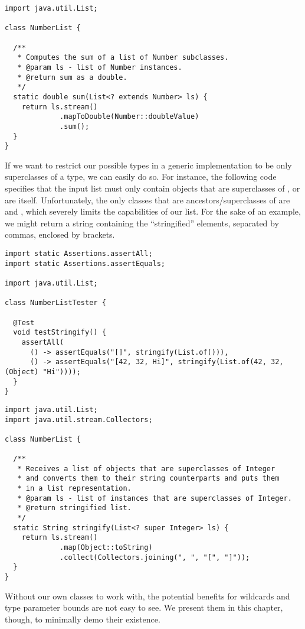 \begin{lstlisting}[language=MyJava]
import java.util.List;

class NumberList {

  /**
   * Computes the sum of a list of Number subclasses.
   * @param ls - list of Number instances.
   * @return sum as a double.
   */
  static double sum(List<? extends Number> ls) {
    return ls.stream()
             .mapToDouble(Number::doubleValue)
             .sum();
  }
}
\end{lstlisting}

If we want to restrict our possible types in a generic implementation to be only superclasses of a type, we can easily do so. 
For instance, the following code specifies that the input list must only contain objects that are superclasses of , or are  itself. 
Unfortunately, the only classes that are ancestors/superclasses of  are  and , which severely limits the capabilities of our list. 
For the sake of an example, we might return a string containing the ``stringified'' elements, separated by commas, enclosed by brackets.

\enlargethispage{-1\baselineskip}
\begin{lstlisting}[language=MyJava]
import static Assertions.assertAll;
import static Assertions.assertEquals;

import java.util.List;

class NumberListTester {

  @Test
  void testStringify() {
    assertAll(
      () -> assertEquals("[]", stringify(List.of())),
      () -> assertEquals("[42, 32, Hi]", stringify(List.of(42, 32, (Object) "Hi"))));
  }
}
\end{lstlisting}

\begin{lstlisting}[language=MyJava]
import java.util.List;
import java.util.stream.Collectors;

class NumberList {

  /**
   * Receives a list of objects that are superclasses of Integer
   * and converts them to their string counterparts and puts them
   * in a list representation.
   * @param ls - list of instances that are superclasses of Integer.
   * @return stringified list.
   */
  static String stringify(List<? super Integer> ls) {
    return ls.stream()
             .map(Object::toString)
             .collect(Collectors.joining(", ", "[", "]"));
  }
}
\end{lstlisting}

Without our own classes to work with, the potential benefits for wildcards and type parameter bounds are not easy to see.
We present them in this chapter, though, to minimally demo their existence.